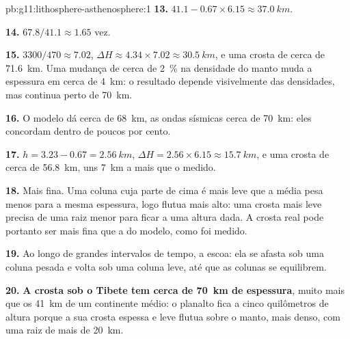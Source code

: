 \begin{solution}{pb:g11:lithosphere-asthenosphere:1}
\textbf{13.} $41.1 - 0.67 \times 6.15 \approx \qty{37.0}{km}$.

\textbf{14.} $67.8/41.1 \approx 1.65$ vez.

\textbf{15.} $3300/470 \approx 7.02$, $\Delta H \approx 4.34 \times 7.02
\approx \qty{30.5}{km}$, e uma crosta de cerca de \qty{71.6}{km}. Uma
mudança de cerca de \qty{2}{\percent} na densidade do manto muda a espessura
em cerca de \qty{4}{km}: o resultado depende visivelmente das densidades,
mas continua perto de \qty{70}{km}.

\textbf{16.} O modelo dá cerca de \qty{68}{km}, as ondas sísmicas cerca de
\qty{70}{km}: eles concordam dentro de poucos por cento.

\textbf{17.} $h = 3.23 - 0.67 = \qty{2.56}{km}$, $\Delta H = 2.56 \times
6.15 \approx \qty{15.7}{km}$, e uma crosta de cerca de \qty{56.8}{km}, uns
\qty{7}{km} a mais que o medido.

\textbf{18.} Mais fina. Uma coluna cuja parte de cima é mais leve que a
média pesa menos para a mesma espessura, logo flutua mais alto: uma crosta
mais leve precisa de uma raiz menor para ficar a uma altura dada. A crosta
real pode portanto ser mais fina que a do modelo, como foi medido.

\textbf{19.} Ao longo de grandes intervalos de tempo, a  escoa:
ela se afasta sob uma coluna pesada e volta sob uma coluna leve, até que as
colunas se equilibrem.

\textbf{20.} \textbf{A crosta sob o Tibete tem cerca de \qty{70}{km} de
espessura}, muito mais que os \qty{41}{km} de um continente médio: o
planalto fica a cinco quilômetros de altura porque a sua crosta espessa e
leve flutua sobre o manto, mais denso, com uma raiz de mais de \qty{20}{km}.
\end{solution}
